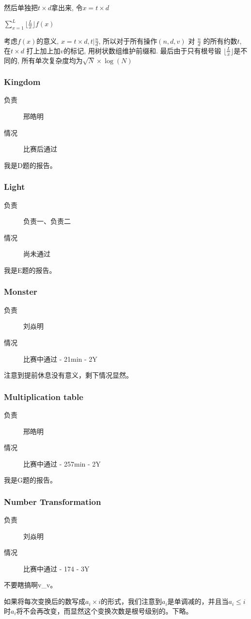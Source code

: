 \documentclass[a4paper, 11pt, nofonts, nocap, fancyhdr]{ctexart}
\newcommand{\problem}[1]{\subsubsection{#1}}
\begin{document}
然后单独把$t\times d$拿出来, 令$x = t\times d$

$\sum\limits_{x=1}^{L} \lfloor \frac{L}{x} \rfloor f(x)$

考虑$f(x)$的意义, $x=t\times d, t | \frac{n}{d}$, 所以对于所有操作$(n, d, v)$ 对 $\frac{n}{d}$ 的所有约数$t$, 在$t\times d$ 打上加上加$v$的标记, 用树状数组维护前缀和. 最后由于只有根号锻 $\lfloor\frac{L}{x}\rfloor$是不同的, 所有单次复杂度均为$\sqrt{N}\times \log(N)$

\problem{Kingdom}

\begin{description}
\item[负责] 邢皓明
\item[情况] 比赛后通过
\end{description}

我是D题的报告。

\problem{Light}

\begin{description}
\item[负责] 负责一、负责二
\item[情况] 尚未通过
\end{description}

我是E题的报告。

\problem{Monster}

\begin{description}
\item[负责] 刘焱明
\item[情况] 比赛中通过 - 21min - 2Y
\end{description}

注意到提前休息没有意义，剩下情况显然。

\problem{Multiplication table}

\begin{description}
\item[负责] 邢皓明
\item[情况] 比赛中通过 - 257min - 2Y
\end{description}

我是G题的报告。


\problem{Number Transformation}

\begin{description}
\item[负责] 刘焱明
\item[情况] 比赛中通过 - 174 - 3Y
\end{description}

不要瞎搞啊v\_v。

如果将每次变换后的数写成$a_i \times i$的形式，我们注意到$a_i$是单调减的，并且当$a_i \leq i$时$a_i$将不会再改变，而显然这个变换次数是根号级别的。下略。
\end{document}
